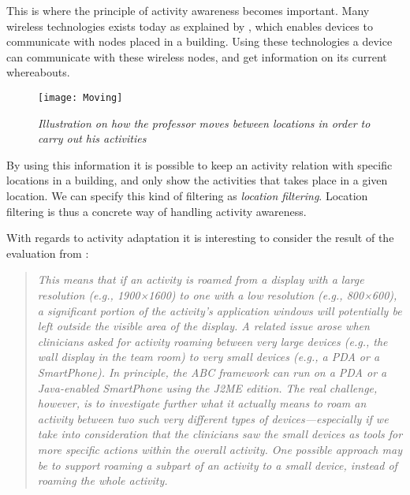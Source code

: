 This is where the principle of activity awareness becomes important. Many wireless technologies exists today as explained by \citet{wirelessWiki}, which enables devices to communicate with nodes placed in a building. Using these technologies a device can communicate with these wireless nodes, and get information on its current whereabouts.

\begin{figure}[h!]
  \centering
    \texttt{[image: Moving]}
  \caption{\emph{Illustration on how the professor moves between locations in order to carry out his activities}}
  \label{fig:locationmovement}
\end{figure}

By using this information it is possible to keep an activity relation with specific locations in a building, and only show the activities that takes place in a given location. We can specify this kind of filtering as \emph{location filtering}. Location filtering is thus a concrete way of handling activity awareness.

With regards to activity adaptation it is interesting to consider the result of the evaluation from \citet{bardram2009}:
\begin{quotation}
	\emph{
		This means that if an activity is roamed from a display with a large resolution (e.g., 1900×1600) to one with a low resolution (e.g., 800×600), a significant portion of the activity’s application windows will potentially be left outside the visible area of the display. A related issue arose when clinicians asked for activity roaming between very large devices (e.g., the wall display in the team room) to very small devices (e.g., a PDA or a SmartPhone). In principle, the ABC framework can run on a PDA or a Java-enabled SmartPhone using the J2ME edition. The real challenge, however, is to investigate further what it actually means to roam an activity between two such very different types of devices—especially if we take into consideration that the clinicians saw the small devices as tools for more specific actions within the overall activity. One possible approach may be to support roaming a subpart of an activity to a small device, instead of roaming the whole activity.
	}
\end{quotation}


